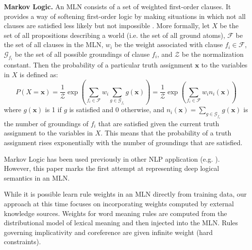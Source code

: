 \noindent\textbf{Markov Logic.}
An MLN consists of a set of weighted first-order clauses.  It provides a way
of softening first-order logic by making situations in which not all clauses
are satisfied less likely but not impossible \citep{richardson:mlj06}. More
formally, let $X$ be the set of all propositions describing a world (i.e. the
set of all ground atoms), $\mathcal{F}$ be the set of all clauses in the MLN,
$w_i$ be the weight associated with clause $f_i \in \mathcal{F}$,
$\mathcal{G}_{f_i}$ be the set of all possible groundings of clause $f_i$, and
$\mathcal{Z}$ be the normalization constant. Then the probability of a
particular truth assignment $\mathbf{x}$ to the variables in $X$ is defined as:
\begin{equation}
P(X = \mathbf{x}) = \frac{1}{\mathcal{Z}} \exp\left(\sum_{f_i \in \mathcal{F}} w_i \sum_{g \in \mathcal{G}_{f_i}}g(\mathbf{x})
\right) 
 = \frac{1}{\mathcal{Z}} \exp\left(\sum_{f_i \in \mathcal{F}} w_i n_i(\mathbf{x}) \right) \tag{1}\label{e1}
\end{equation}
where $g(\mathbf{x})$ is 1 if $g$ is satisfied and 0 otherwise, and 
$n_i(\mathbf{x})= \sum_{g\in \mathcal{G}_{f_i}}g(\mathbf{x})$ is the number of
groundings of $f_i$ that are satisfied given the current truth assignment to the
variables in $X$. This means that the probability of a truth assignment rises
exponentially with the number of groundings that are satisfied.

Markov Logic has been used previously in other NLP application
(e.g. \citet{poon:emnlp2009}).  However, this paper marks the first attempt at
representing deep logical semantics in an MLN.

While it is possible learn rule weights in an MLN directly from training data,
our approach at this time focuses on incorporating weights computed
by external knowledge sources.  Weights for word meaning rules are computed from
the distributional model of lexical meaning and then injected into the MLN. 
Rules governing implicativity and coreference are given infinite weight
(hard constraints).


